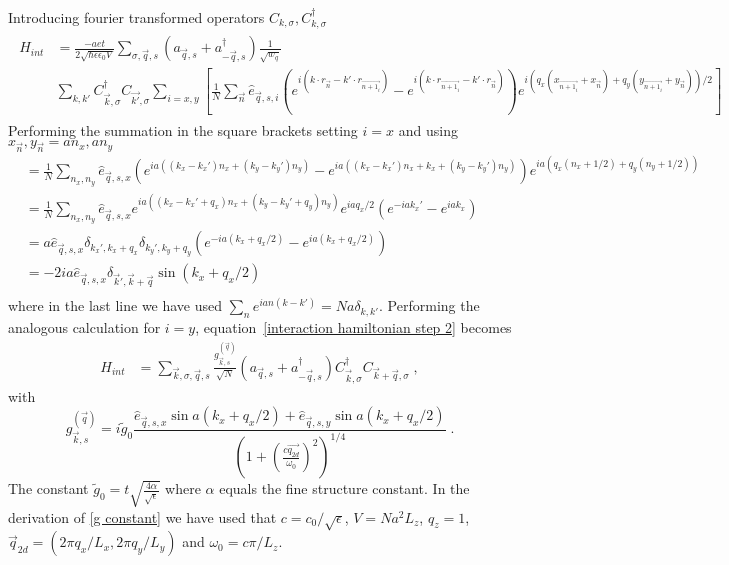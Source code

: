 \documentclass{article}
\begin{document}
Introducing fourier transformed operators $C_{k,\sigma} , C_{k,\sigma}^{\dagger}$
\begin{align*}
    \begin{split}
    H_{int} &= \frac{-aet}{2\sqrt{\hbar \epsilon \epsilon_0 V} } \sum_{\sigma,\vec{q},s} \left(a_{\vec{q},s} + a_{-\vec{q}, s}^{\dagger}\right) \frac{1}{\sqrt{w_q}} \\ 
            & \sum_{k,k'}   C_{\vec{k},\sigma}^{\dagger} C_{\vec{k'},\sigma} \sum_{i=x,y} \left[\frac{1}{N}\sum_{\vec{n}} \hat{e}_{\vec{q},s,i} ( e^{i\left(k \cdot r_{\vec{n}} - k' \cdot r_{\vec{n+1_i}} \right)} - e^{i\left(k \cdot r_{\vec{n+1_i}} - k' \cdot r_{\vec{n}} \right)}) e^{i\left(q_x \left(x_{\vec{n + 1_i}} + x_{\vec{n}} \right) + q_y \left(y_{\vec{n + 1_i}} + y_{\vec{n}} \right)\right)/2}\right]
    \end{split}
    \label{interaction hamiltonian step 2}
\end{align*}
Performing the summation in the square brackets setting $i = x$ and using $x_{\vec{n}},y_{\vec{n}} = a n_x, a n_y$
\begin{align*}
    [...] &= \frac{1}{N}\sum_{n_x, n_y} \hat{e}_{\vec{q},s,x} ( e^{i a\left((k_x - k_x') n_x + (k_y - k_y') n_y \right)} -  e^{i a\left((k_x - k_x') n_x + k_x + (k_y - k_y') n_y \right)}) e^{i a \left(q_x \left(n_x + 1/2\right) + q_y (n_y + 1/2)\right)}\\
          &= \frac{1}{N}\sum_{n_x, n_y} \hat{e}_{\vec{q},s,x} e^{i a\left((k_x - k_x' + q_x) n_x + (k_y - k_y' + q_y) n_y \right)} e^{ia q_x / 2} ( e^{- i a k_x' } -  e^{i a k_x })\\
          &= a \hat{e}_{\vec{q},s,x} \delta_{k_x',k_x + q_x} \delta_{k_y',k_y + q_y}  ( e^{- i a (k_x + q_x /2) } -  e^{i a (k_x + q_x/2)  })\\
          &=   -2 i a \hat{e}_{\vec{q},s,x} \delta_{\vec{k}',\vec{k} + \vec{q}} \sin(k_x + q_x /2)\\
\end{align*}
where in the last line we have used $\sum_n e^{ian(k - k')} = N a \delta_{k,k'}$. Performing the analogous calculation for $i = y$, equation~\cref{interaction hamiltonian step 2} becomes
\begin{align}
    H_{int} &=  \sum_{\vec{k},\sigma,\vec{q},s} \frac{g_{\vec{k},s}^{(\vec{q})}}{\sqrt{N}} \left(a_{\vec{q},s} + a_{-\vec{q}, s}^{\dagger}\right) C_{\vec{k},\sigma}^{\dagger} C_{\vec{k} + \vec{q},\sigma} \;,
\end{align}
with 
\begin{equation}
   g_{\vec{k},s}^{(\vec{q})} = i \tilde{g}_0 \frac{\hat{e}_{\vec{q},s,x} \sin{a(k_x + q_x /2)} + \hat{e}_{\vec{q},s,y} \sin{a(k_x + q_x /2)}}{\left(1 + \left(\frac{c\vec{q_{2d}}}{\omega_0}\right)^2\right)^{1/4}}\;.
   \label{g constant}
\end{equation}
The constant $\tilde{g}_0 = t\sqrt{\frac{4 \alpha}{\sqrt{\epsilon}}}$ where $\alpha$ equals the fine structure constant. In the derivation of \cref{g constant} we have used that  $c = c_0 / \sqrt{\epsilon}$, $V = N a^2 L_z$, $q_z = 1$, $\vec{q}_{2d} = (2\pi q_x / L_x, 2\pi q_y / L_y) $ and $\omega_0 = c\pi / L_z$.
\end{document}

